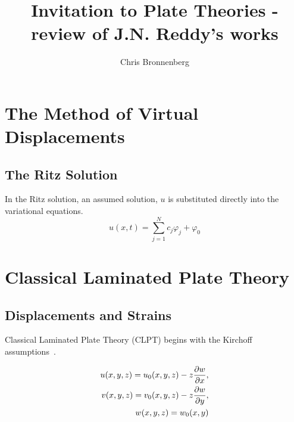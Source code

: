 \documentclass[11pt,letterpaper,titlepage,draft]{article}
\author{Chris Bronnenberg}
\title{Invitation to Plate Theories - review of J.N. Reddy's works}
\newcommand{\PDer}[2]{\frac{\partial #1}{\partial #2}}
\numberwithin{equation}{subsection}
\begin{document}
\maketitle
\tableofcontents
\newpage


\section{The Method of Virtual Displacements}
\subsection{The Ritz Solution}
In the Ritz solution, an assumed solution, $u$ is substituted directly into the variational
equations.
\begin{equation}
    u(x,t) = \sum_{j=1}^N c_j\varphi_j + \varphi_0
\end{equation}

%
\section{Classical Laminated Plate Theory}
\subsection{Displacements and Strains}
Classical Laminated Plate Theory (CLPT) begins with the Kirchoff assumptions~\cite{reddy_2004}.

\begin{eqnarray}\label{E:S1001:SS101:1}
u(x,y,z) = u_0(x,y,z) - z \PDer{w}{x},\notag \\ 
v(x,y,z) = v_0(x,y,z) - z \PDer{w}{y}, \\
w(x,y,z) = w_0(x,y)\notag
\end{eqnarray}
\end{document}
